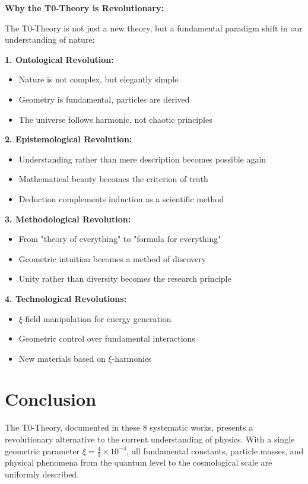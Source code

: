 \documentclass[12pt,a4paper]{article}
\newcommand{\xipar}{\xi}
\begin{document}
	\begin{foundation}
		\textbf{Why the T0-Theory is Revolutionary:}
		
		The T0-Theory is not just a new theory, but a fundamental paradigm shift in our understanding of nature:
		
		\textbf{1. Ontological Revolution:}
		\begin{itemize}
			\item Nature is not complex, but elegantly simple
			\item Geometry is fundamental, particles are derived
			\item The universe follows harmonic, not chaotic principles
		\end{itemize}
		
		\textbf{2. Epistemological Revolution:}
		\begin{itemize}
			\item Understanding rather than mere description becomes possible again
			\item Mathematical beauty becomes the criterion of truth
			\item Deduction complements induction as a scientific method
		\end{itemize}
		
		\textbf{3. Methodological Revolution:}
		\begin{itemize}
			\item From "theory of everything" to "formula for everything"
			\item Geometric intuition becomes a method of discovery
			\item Unity rather than diversity becomes the research principle
		\end{itemize}
		
		\textbf{4. Technological Revolutions:}
		\begin{itemize}
			\item $\xi$-field manipulation for energy generation
			\item Geometric control over fundamental interactions
			\item New materials based on $\xi$-harmonies
		\end{itemize}
	\end{foundation}
	
	\section{Conclusion}
	
	The T0-Theory, documented in these 8 systematic works, presents a revolutionary alternative to the current understanding of physics. With a single geometric parameter $\xipar = \frac{4}{3} \times 10^{-4}$, all fundamental constants, particle masses, and physical phenomena from the quantum level to the cosmological scale are uniformly described.
	
\end{document}
